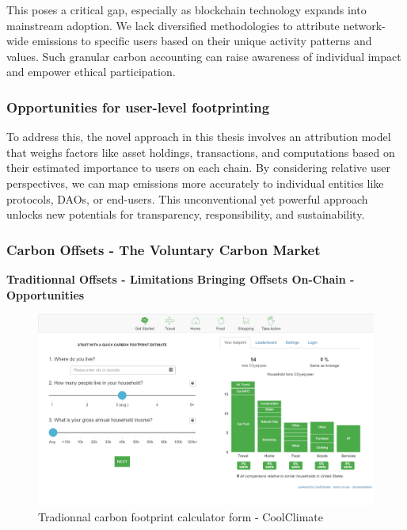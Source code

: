 \documentclass[11pt]{report}
\begin{document}
This poses a critical gap, especially as blockchain technology expands into mainstream adoption. We lack diversified methodologies to attribute network-wide emissions to specific users based on their unique activity patterns and values. Such granular carbon accounting can raise awareness of individual impact and empower ethical participation.

\subsubsection*{Opportunities for user-level footprinting}

To address this, the novel approach in this thesis involves an attribution model that weighs factors like asset holdings, transactions, and computations based on their estimated importance to users on each chain. By considering relative user perspectives, we can map emissions more accurately to individual entities like protocols, DAOs, or end-users. This unconventional yet powerful approach unlocks new potentials for transparency, responsibility, and sustainability.

\subsubsection{Carbon Offsets - The Voluntary Carbon Market}
\textbf{Traditionnal Offsets - Limitations}
\textbf{Bringing Offsets On-Chain - Opportunities }

\begin{figure}[hbt!]
    \centering
    \centerline{\includegraphics[scale=0.25]{figures/carbon_footprint_calculator.png}}
    \caption[YO]{Tradionnal carbon footprint calculator form - CoolClimate\footnotemark}
    \label{fig:carbon_footprint_calculator}
\end{figure}
\end{document}

